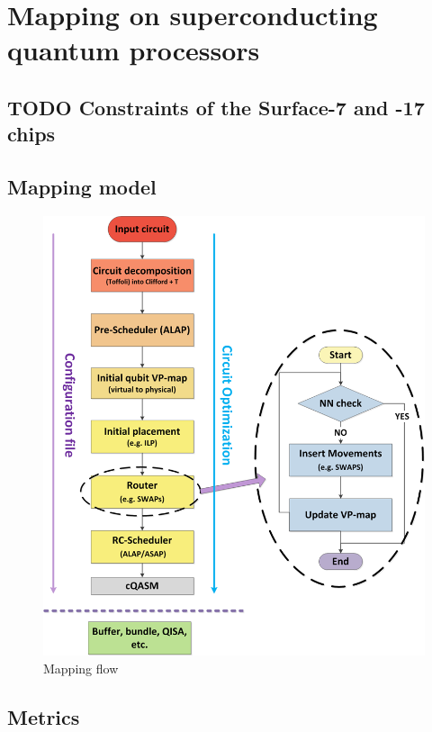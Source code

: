 
\chapter*{Mapping on superconducting quantum processors}
\label{sec:orgcec5da3}
\section*{{\bfseries\sffamily TODO} Constraints of the Surface-7 and -17 chips}
\label{sec:orga48d549}


\section*{Mapping model}
\label{sec:org82318b7}

\begin{figure}[htbp]
\centering
\includegraphics[width=\textwidth]{figures/mapping_flow2.png}
\caption{\label{fig:org5082378}
Mapping flow}
\end{figure}

\section*{Metrics}
\label{sec:org160f161}
